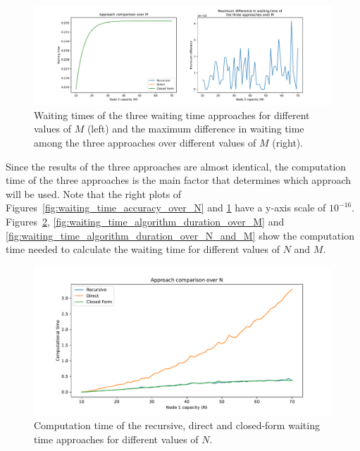 \begin{figure}[H]
    \includegraphics[width=\textwidth]{chapters/03_queueing_model/Bin/numeric_results_and_timings/waiting_time_formulas_comparison/waiting_time_over_M.pdf}
    \caption{Waiting times of the three waiting time approaches for different
    values of \(M\) (left) and the maximum difference in waiting time among
    the three approaches over different values of \(M\) (right).}
    \label{fig:waiting_time_accuracy_over_M}
\end{figure}


Since the results of the three approaches are almost identical, the computation
time of the three approaches is the main factor that determines which
approach will be used.
Note that the right plots of Figures~\ref{fig:waiting_time_accuracy_over_N} and
\ref{fig:waiting_time_accuracy_over_M} have a y-axis scale of \(10^{-16}\).
Figures~\ref{fig:waiting_time_algorithm_duration_over_N},
\ref{fig:waiting_time_algorithm_duration_over_M} and
\ref{fig:waiting_time_algorithm_duration_over_N_and_M} show the computation
time needed to calculate the waiting time for different values of \(N\) and
\(M\).

\begin{figure}[H]
    \includegraphics[width=\textwidth]{chapters/03_queueing_model/Bin/numeric_results_and_timings/waiting_time_formulas_comparison/algorithm_duration_over_N.pdf}
    \caption{Computation time of the recursive, direct and closed-form waiting
    time approaches for different values of \(N\).}
    \label{fig:waiting_time_algorithm_duration_over_N}
\end{figure}

